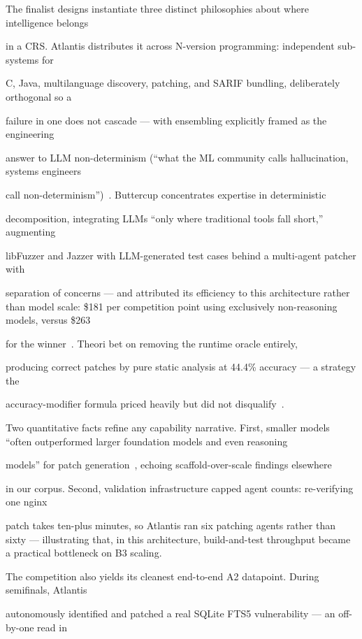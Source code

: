 \documentclass[conference,compsoc]{IEEEtran}
\begin{document}
\label{sec:aixcc-epistemics}

The finalist designs instantiate three distinct philosophies about where intelligence belongs

in a CRS. Atlantis distributes it across N-version programming: independent sub-systems for

C, Java, multilanguage discovery, patching, and SARIF bundling, deliberately orthogonal so a

failure in one does not cascade --- with ensembling explicitly framed as the engineering

answer to LLM non-determinism (``what the ML community calls hallucination, systems engineers

call non-determinism'')~\cite{taafc2025}. Buttercup concentrates expertise in deterministic

decomposition, integrating LLMs ``only where traditional tools fall short,'' augmenting

libFuzzer and Jazzer with LLM-generated test cases behind a multi-agent patcher with

separation of concerns --- and attributed its efficiency to this architecture rather than model
scale: \$181 per competition point using exclusively non-reasoning models, versus \$263

for the winner~\cite{tobbuttercup2025}. Theori bet on removing the runtime oracle entirely,

producing correct patches by pure static analysis at 44.4\% accuracy --- a strategy the

accuracy-modifier formula priced heavily but did not disqualify~\cite{taafc2025}.

Two quantitative facts refine any capability narrative. First, smaller models ``often
outperformed larger foundation models and even reasoning

models'' for patch generation~\cite{taafc2025}, echoing scaffold-over-scale findings elsewhere

in our corpus. Second, validation infrastructure capped agent counts: re-verifying one nginx

patch takes ten-plus minutes, so Atlantis ran six patching agents rather than sixty ---
illustrating that, in this architecture, build-and-test throughput became a practical bottleneck
on B3 scaling.

The competition also yields its cleanest end-to-end A2 datapoint. During semifinals, Atlantis

autonomously identified and patched a real SQLite FTS5 vulnerability --- an off-by-one read in
\end{document}

